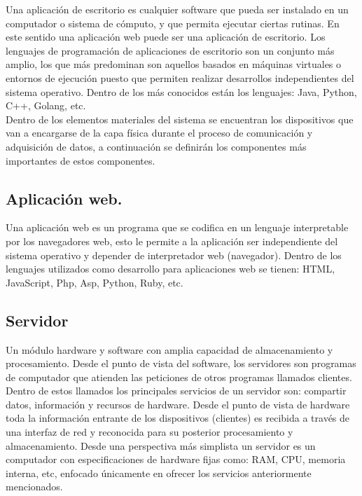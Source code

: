 Una aplicación de escritorio es cualquier software que pueda ser instalado en un computador o sistema de cómputo, y que permita ejecutar ciertas rutinas. En este sentido una aplicación web puede ser una aplicación de escritorio. Los lenguajes de programación de aplicaciones de escritorio son un conjunto más amplio, los que más predominan son aquellos basados en máquinas virtuales o entornos de ejecución puesto que permiten realizar desarrollos independientes del sistema operativo. Dentro de los más conocidos están los lenguajes: Java, Python, C++, Golang, etc.
\vspace{0.5cm}\\
Dentro de los elementos materiales del sistema se encuentran los dispositivos que van a encargarse de la capa física durante el proceso de comunicación y adquisición de datos, a continuación se definirán los componentes más importantes de estos componentes.

\subsection{Aplicación web.}

Una aplicación web es un programa que se codifica en un lenguaje interpretable por los navegadores web, esto le permite a la aplicación ser independiente del sistema operativo y depender de interpretador web (navegador). Dentro de los lenguajes utilizados como desarrollo para aplicaciones web se tienen: HTML, JavaScript, Php, Asp, Python, Ruby, etc.

\subsection{Servidor}

Un módulo hardware y software con amplia capacidad de almacenamiento y procesamiento. Desde el punto de vista del software, los servidores son programas de computador que atienden las peticiones de otros programas llamados clientes. Dentro de estos llamados los principales servicios de un servidor son: compartir datos, información y recursos de hardware. Desde el punto de vista de hardware toda la información entrante de los dispositivos (clientes) es recibida a través de una interfaz de red y reconocida para su posterior procesamiento y almacenamiento.
Desde una perspectiva más simplista un servidor es un computador con especificaciones de hardware fijas como: RAM, CPU, memoria interna, etc, enfocado únicamente en ofrecer los servicios anteriormente mencionados.

